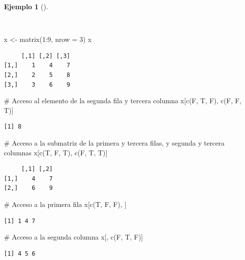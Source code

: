 \documentclass[
  spanish,
  a4paper,
]{scrreport}
\newenvironment{Shaded}{\begin{snugshade}}{\end{snugshade}}
\newcommand{\AttributeTok}[1]{\textcolor[rgb]{0.40,0.45,0.13}{#1}}
\newcommand{\CommentTok}[1]{\textcolor[rgb]{0.37,0.37,0.37}{#1}}
\newcommand{\DecValTok}[1]{\textcolor[rgb]{0.68,0.00,0.00}{#1}}
\newcommand{\FunctionTok}[1]{\textcolor[rgb]{0.28,0.35,0.67}{#1}}
\newcommand{\NormalTok}[1]{\textcolor[rgb]{0.00,0.23,0.31}{#1}}
\newcommand{\OtherTok}[1]{\textcolor[rgb]{0.00,0.23,0.31}{#1}}
\newcommand{\SpecialCharTok}[1]{\textcolor[rgb]{0.37,0.37,0.37}{#1}}
\theoremstyle{definition}
\theoremstyle{definition}
\newtheorem{example}{Ejemplo}[chapter]
\theoremstyle{remark}
\begin{document}
\begin{example}[]\protect\hypertarget{exm-acceso-matriz-logico}{}\label{exm-acceso-matriz-logico}

~

\begin{Shaded}
\begin{Highlighting}[]
\NormalTok{x }\OtherTok{\textless{}{-}} \FunctionTok{matrix}\NormalTok{(}\DecValTok{1}\SpecialCharTok{:}\DecValTok{9}\NormalTok{, }\AttributeTok{nrow =} \DecValTok{3}\NormalTok{)}
\NormalTok{x}
\end{Highlighting}
\end{Shaded}

\begin{verbatim}
     [,1] [,2] [,3]
[1,]    1    4    7
[2,]    2    5    8
[3,]    3    6    9
\end{verbatim}

\begin{Shaded}
\begin{Highlighting}[]
\CommentTok{\# Acceso al elemento de la segunda fila y tercera columna}
\NormalTok{x[}\FunctionTok{c}\NormalTok{(F, T, F), }\FunctionTok{c}\NormalTok{(F, F, T)]}
\end{Highlighting}
\end{Shaded}

\begin{verbatim}
[1] 8
\end{verbatim}

\begin{Shaded}
\begin{Highlighting}[]
\CommentTok{\# Acceso a la submatriz de la primera y tercera filas, y segunda y tercera columnas}
\NormalTok{x[}\FunctionTok{c}\NormalTok{(T, F, T), }\FunctionTok{c}\NormalTok{(F, T, T)]}
\end{Highlighting}
\end{Shaded}

\begin{verbatim}
     [,1] [,2]
[1,]    4    7
[2,]    6    9
\end{verbatim}

\begin{Shaded}
\begin{Highlighting}[]
\CommentTok{\# Acceso a la primera fila}
\NormalTok{x[}\FunctionTok{c}\NormalTok{(T, F, F), ]}
\end{Highlighting}
\end{Shaded}

\begin{verbatim}
[1] 1 4 7
\end{verbatim}

\begin{Shaded}
\begin{Highlighting}[]
\CommentTok{\# Acceso a la segunda columna}
\NormalTok{x[, }\FunctionTok{c}\NormalTok{(F, T, F)]}
\end{Highlighting}
\end{Shaded}

\begin{verbatim}
[1] 4 5 6
\end{verbatim}

\end{example}
\end{document}
